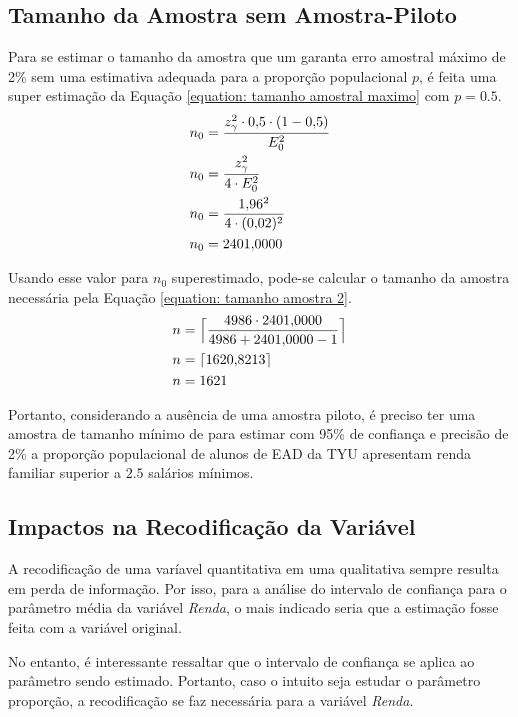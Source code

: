 \subsection{Tamanho da Amostra sem Amostra-Piloto}

	Para se estimar o tamanho da amostra que um garanta erro amostral máximo de
	2\% sem uma estimativa adequada para a proporção populacional $p$, é
	feita uma super estimação da Equação \ref{equation: tamanho amostral
	maximo} com $p = 0.5$.
	\begin{align*}
		n_0 &= \frac{z_\gamma^2 \cdot \num{0.5} \cdot (1 - \num{0.5})}{E_0^2} \\
		n_0 &= \frac{z_\gamma^2}{4 \cdot E_0^2} \\
		n_0 &= \frac{\num{1.96}^2}{4 \cdot (\num{0.02})^2} \\
		n_0 &= \num{2401.0000}
	\end{align*}

	Usando esse valor para $n_0$ superestimado, pode-se calcular o tamanho da
	amostra necessária pela Equação \ref{equation: tamanho amostra 2}.
	\begin{align*}
		n &= \Big\lceil \frac{4986 \cdot \num{2401.0000}}{4986 + \num{2401.0000} - 1} \Big\rceil \\
		n &= \lceil \num{1620.8213} \rceil \\
		n &= 1621
	\end{align*}

	Portanto, considerando a ausência de uma amostra piloto, é preciso ter uma
	amostra de tamanho mínimo de \SEISCnceil para estimar com 95\% de
	confiança e precisão de 2\% a proporção populacional de alunos de EAD da TYU
	apresentam renda familiar superior a $\num{2,5}$ salários mínimos.

\subsection{Impactos na Recodificação da Variável}
	
	A recodificação de uma varíavel quantitativa em uma qualitativa sempre
	resulta em perda de informação. Por isso, para a análise do intervalo de
	confiança para o parâmetro média da variável \textit{Renda}, o mais
	indicado seria que a estimação fosse feita com a variável original.

	No entanto, é interessante ressaltar que o intervalo de confiança se
	aplica ao parâmetro sendo estimado. Portanto, caso o intuito seja
	estudar o parâmetro proporção, a recodificação se faz necessária para a
	variável \textit{Renda}.
